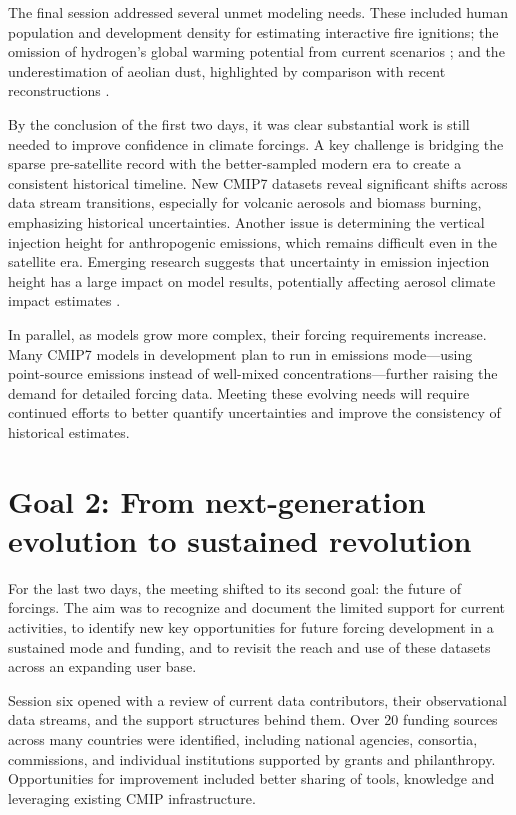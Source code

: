 \documentclass{ametsocV6.1}
\begin{document}
The final session addressed several unmet modeling needs. These included human population and development density for estimating interactive fire ignitions; the omission of hydrogen’s global warming potential from current scenarios \citep[e.g.,][]{sand_multi-model_2023}; and the underestimation of aeolian dust, highlighted by comparison with recent reconstructions \citep[e.g.,][]{kok_mineral_2023}.

By the conclusion of the first two days, it was clear substantial work is still needed to improve confidence in climate forcings. A key challenge is bridging the sparse pre-satellite record with the better-sampled modern era to create a consistent historical timeline. New CMIP7 datasets reveal significant shifts across data stream transitions, especially for volcanic aerosols and biomass burning, emphasizing historical uncertainties. Another issue is determining the vertical injection height for anthropogenic emissions, which remains difficult even in the satellite era. Emerging research suggests that uncertainty in emission injection height has a large impact on model results, potentially affecting aerosol climate impact estimates \citep[e.g.,][]{ahsan_emissions_2023}.

In parallel, as models grow more complex, their forcing requirements increase. Many CMIP7 models in development plan to run in emissions mode—using point-source emissions instead of well-mixed concentrations—further raising the demand for detailed forcing data. Meeting these evolving needs will require continued efforts to better quantify uncertainties and improve the consistency of historical estimates.

\section*{Goal 2: From next-generation evolution to sustained revolution}
For the last two days, the meeting shifted to its second goal: the future of forcings. The aim was to recognize and document the limited support for current activities, to identify new key opportunities for future forcing development in a sustained mode and funding, and to revisit the reach and use of these datasets across an expanding user base.

Session six opened with a review of current data contributors, their observational data streams, and the support structures behind them. Over 20 funding sources across many countries were identified, including national agencies, consortia, commissions, and individual institutions supported by grants and philanthropy. Opportunities for improvement included better sharing of tools, knowledge and leveraging existing CMIP infrastructure.
\end{document}
